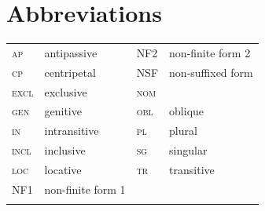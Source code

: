 \documentclass[output=paper,newtxmath,modfonts,nonflat]{langsci/langscibook}
\begin{document}
\section*{Abbreviations}
\begin{tabularx}{.55\textwidth}{llll}
	\textsc{ap} & antipassive & NF2 & non-finite form 2\\
	\textsc{cp} & centripetal & NSF & non-suffixed form\\
	\textsc{excl} & exclusive & \textsc{nom} & \isi{nominative}\\
	\textsc{gen} & genitive & \textsc{obl} & oblique\\
	\textsc{in} & intransitive & \textsc{pl} & plural\\
	\textsc{incl} & inclusive & \textsc{sg} & singular\\
	\textsc{loc} & locative & \textsc{tr} & transitive\\
	\textsc{NF1} & non-finite form 1 & & \\
	\\
\end{tabularx}







\end{document}
